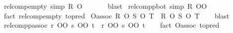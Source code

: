 \begin{isabellebody}
\endisatagproof
{\isafoldproof}%
%
\isadelimproof
\isanewline
%
\endisadelimproof
\isanewline
{}\isamarkupfalse%
\ relcomp{\isacharunderscore}{\kern0pt}empty{}\ {\isacharbrackleft}{\kern0pt}simp{\isacharbrackright}{\kern0pt}{\isacharcolon}{\kern0pt}\ {\isachardoublequoteopen}R\ O\ {\isacharbraceleft}{\kern0pt}{\isacharbraceright}{\kern0pt}\ {\isacharequal}{\kern0pt}\ {\isacharbraceleft}{\kern0pt}{\isacharbraceright}{\kern0pt}{\isachardoublequoteclose}\isanewline
%
\isadelimproof
\ \ %
\endisadelimproof
%
\isatagproof
{}\isamarkupfalse%
\ blast%
\endisatagproof
{\isafoldproof}%
%
\isadelimproof
\isanewline
%
\endisadelimproof
\isanewline
{}\isamarkupfalse%
\ relcompp{\isacharunderscore}{\kern0pt}bot{}\ {\isacharbrackleft}{\kern0pt}simp{\isacharbrackright}{\kern0pt}{\isacharcolon}{\kern0pt}\ {\isachardoublequoteopen}R\ OO\ {\isasymbottom}\ {\isacharequal}{\kern0pt}\ {\isasymbottom}{\isachardoublequoteclose}\isanewline
%
\isadelimproof
\ \ %
\endisadelimproof
%
\isatagproof
{}\isamarkupfalse%
\ {\isacharparenleft}{\kern0pt}fact\ relcomp{\isacharunderscore}{\kern0pt}empty{}\ {\isacharbrackleft}{\kern0pt}to{\isacharunderscore}{\kern0pt}pred{\isacharbrackright}{\kern0pt}{\isacharparenright}{\kern0pt}%
\endisatagproof
{\isafoldproof}%
%
\isadelimproof
\isanewline
%
\endisadelimproof
\isanewline
{}\isamarkupfalse%
\ O{\isacharunderscore}{\kern0pt}assoc{\isacharcolon}{\kern0pt}\ {\isachardoublequoteopen}{\isacharparenleft}{\kern0pt}R\ O\ S{\isacharparenright}{\kern0pt}\ O\ T\ {\isacharequal}{\kern0pt}\ R\ O\ {\isacharparenleft}{\kern0pt}S\ O\ T{\isacharparenright}{\kern0pt}{\isachardoublequoteclose}\isanewline
%
\isadelimproof
\ \ %
\endisadelimproof
%
\isatagproof
{}\isamarkupfalse%
\ blast%
\endisatagproof
{\isafoldproof}%
%
\isadelimproof
\isanewline
%
\endisadelimproof
\isanewline
{}\isamarkupfalse%
\ relcompp{\isacharunderscore}{\kern0pt}assoc{\isacharcolon}{\kern0pt}\ {\isachardoublequoteopen}{\isacharparenleft}{\kern0pt}r\ OO\ s{\isacharparenright}{\kern0pt}\ OO\ t\ {\isacharequal}{\kern0pt}\ r\ OO\ {\isacharparenleft}{\kern0pt}s\ OO\ t{\isacharparenright}{\kern0pt}{\isachardoublequoteclose}\isanewline
%
\isadelimproof
\ \ %
\endisadelimproof
%
\isatagproof
{}\isamarkupfalse%
\ {\isacharparenleft}{\kern0pt}fact\ O{\isacharunderscore}{\kern0pt}assoc\ {\isacharbrackleft}{\kern0pt}to{\isacharunderscore}{\kern0pt}pred{\isacharbrackright}{\kern0pt}{\isacharparenright}{\kern0pt}%
\endisatagproof
{\isafoldproof}%

\end{isabellebody}
